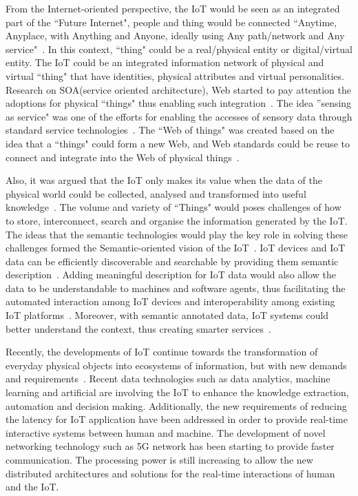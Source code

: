 From the Internet-oriented perspective, the IoT would be seen as an integrated part of the ``Future Internet", people and thing would be connected ``Anytime, Anyplace, with Anything and Anyone, ideally using Any path/network and Any service"~\citep{Sundmaeker:2010}.
In this context, ``thing" could be a real/physical entity or digital/virtual entity.
The IoT could be an integrated information network of physical and virtual ``thing" that have identities, physical attributes and virtual personalities.  
Research on SOA(service oriented architecture), Web started to pay attention the adoptions for physical ``things" thus enabling such integration~\citep{De:2011, De:2012,Guinard:2009}. 
The idea ''sensing as service" was one of the efforts for enabling the accesses of sensory data through standard service technologies~\citep{Zaslavsky:2013,Perera:2014a}. 
The ``Web of things" was created based on the idea that a ``things" could form a new Web, and Web standards could be reuse to connect and integrate into the Web of physical things~\citep{Christophe:2011}.

Also, it was argued that the IoT only makes its value when the data of the physical world could be collected, analysed and transformed into useful knowledge~\citep{Vermesan:2011}.
The volume and variety of ``Things" would poses challenges of how to store, interconnect, search and organise the information generated by the IoT. 
The ideas that the semantic technologies would play the key role in solving these challenges formed the Semantic-oriented vision of the IoT~\citep{Atzori:2014,Barnaghi:2012}.
IoT devices and IoT data can be efficiently discoverable and searchable by providing them semantic description~\citep{Ioan:2009, Chun:2015,Serena:2017}. 
Adding meaningful description for IoT data would also allow the data to be understandable to machines and software agents, thus facilitating the automated interaction among IoT devices and interoperability among existing IoT platforms~\citep{IERC:2015, Ganzha:2017}. 
Moreover, with semantic annotated data, IoT systems could better understand the context, thus creating smarter services~\citep{Perera:2014b}. 

Recently, the developments of IoT continue towards the transformation of everyday physical objects into ecosystems of information, but with new demands and requirements~\citep{Vermesan:2018}.
Recent data technologies such as data analytics, machine learning and artificial are involving the IoT to enhance the knowledge extraction, automation and decision making. 
Additionally, the new requirements of reducing the latency for IoT application have been addressed in order to provide real-time interactive systems between human and machine.
The development of novel networking technology such as 5G network has been starting to provide faster communication.
The processing power is still increasing to allow the new distributed architectures and solutions for the real-time interactions of human and the IoT.  

